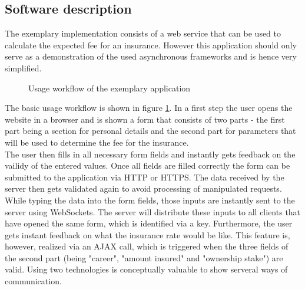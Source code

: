 \subsection{Software description}
\label{software_description}
\FloatBarrier
The exemplary implementation consists of a web service that can be used to calculate
the expected fee for an insurance. However this application should only serve as a 
demonstration of the used asynchronous frameworks and is hence very simplified.

\begin{figure}[h]
	\centering
	\setlength\fboxsep{2pt}
	\caption{Usage workflow of the exemplary application}
	\label{fig:application_workflow}
\end{figure}


The basic usage workflow is shown in figure \ref{fig:application_workflow}. In a
first step the user opens the website in a browser and is shown a form that
consists of two parts - the first part being a section for personal details and
the second part for parameters that will be used to determine the fee for the
insurance.\\
The user then fills in all necessary form fields and instantly gets feedback on
the vailidy of the entered values. Once all fields are filled correctly the form
can be submitted to the application via HTTP or HTTPS. The data received by the server
then gets validated again to avoid processing of manipulated requests.\\

While typing the data into the form fields, those inputs are instantly sent to the server using WebSockets.
The server will distribute these inputs to all clients that have opened the same form,
which is identified via a key. Furthermore, the user gets instant feedback on what the
insurance rate would be like. This feature is, however, realized via an AJAX call, which is triggered
when the three fields of the second part (being "career", "amount insured" and "ownership stake") are valid. Using two technologies is conceptually valuable to show serveral ways of communication.

